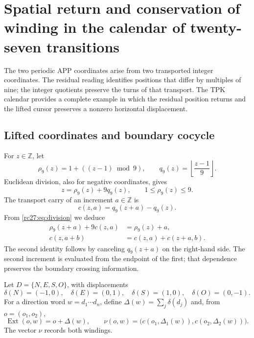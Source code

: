 
\section[Spatial return and winding of the cursor]{Spatial return and conservation of winding in the calendar of twenty-seven transitions}
\label{rc27:sec:cursor}

The two periodic APP coordinates arise from two transported integer
coordinates. The residual reading identifies positions that
differ by multiples of nine; the integer quotients preserve the
turns of that transport. The TPK calendar provides a complete
example in which the residual position returns and the lifted cursor
preserves a nonzero horizontal displacement.

\subsection{Lifted coordinates and boundary cocycle}

For $z\in\mathbb Z$, let
\[
\rho_9(z)=1+((z-1)\bmod9),\qquad
q_9(z)=\left\lfloor\frac{z-1}{9}\right\rfloor.
\]
Euclidean division, also for negative coordinates, gives
\begin{equation}
z=\rho_9(z)+9q_9(z),\qquad1\le\rho_9(z)\le9.
\label{rc27:eq:division}
\end{equation}
The transport carry of an increment $a\in\mathbb Z$ is
\[
c(z,a)=q_9(z+a)-q_9(z).
\]
From \eqref{rc27:eq:division} we deduce
\begin{align}
\rho_9(z+a)+9c(z,a)&=\rho_9(z)+a,\\
c(z,a+b)&=c(z,a)+c(z+a,b).
\label{rc27:eq:cociclo}
\end{align}
The second identity follows by canceling $q_9(z+a)$ on the right-hand
side. The second increment is evaluated from the endpoint of the first;
that dependence preserves the boundary crossing information.

Let $D=\{N,E,S,O\}$, with displacements
\[
\delta(N)=(-1,0),\quad\delta(E)=(0,1),\quad
\delta(S)=(1,0),\quad\delta(O)=(0,-1).
\]
For a direction word $w=d_1\cdots d_n$, define
$\Delta(w)=\sum_j\delta(d_j)$ and, from $o=(o_1,o_2)$,
\[
\operatorname{Ext}(o,w)=o+\Delta(w),\qquad
\nu(o,w)=\bigl(c(o_1,\Delta_1(w)),c(o_2,\Delta_2(w))\bigr).
\]
The vector $\nu$ records both windings.

